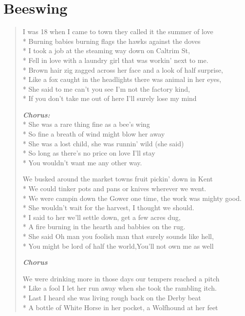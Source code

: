 \documentclass[9pt,twoside]{extarticle}
\newenvironment{xverse}{
	\begin{verse}
	\fontsize{8.5}{10.5}\selectfont
	}
	{
	\end{verse}
	\penalty 0
}
\newcommand{\chorusdef}{\textbf{\emph{Chorus:}}\\*}
\newcommand{\chorusmark}[1][1]{%
\vspace{-0.5\stanzaskip}%
\textbf{\emph{Chorus \ifthenelse{\equal{#1}{1}}{}{$\times$ #1}}}%
\vspace{-0.5\stanzaskip}%
}
\begin{document}
\section{Beeswing}
\begin{xverse}
I was 18 when I came to town they called it the summer of love \\*
Burning babies burning flags the hawks against the doves \\*
I took a job at the steaming way down on Caltrim St, \\*
Fell in love with a laundry girl that was workin’ next to me. \\*
Brown hair zig zagged across her face and a look of half surprise, \\*
Like a fox caught in the headlights there was animal in her eyes, \\*
She said to me can’t you see I’m not the factory kind, \\*
If you don’t take me out of here I’ll surely lose my mind

\chorusdef
She was a rare thing fine as a bee’s wing \\*
So fine a breath of wind might blow her away \\*
She was a lost child, she was runnin’ wild (she said) \\*
So long as there’s no price on love I’ll stay \\*
You wouldn’t want me any other way.

We busked around the market towns fruit pickin’ down in Kent \\*
We could tinker pots and pans or knives wherever we went. \\*
We were campin down the Gower one time, the work was mighty good. \\*
She wouldn’t wait for the harvest, I thought we should. \\*
I said to her we’ll settle down, get a few acres dug, \\*
A fire burning in the hearth and babbies on the rug. \\*
She said Oh man you foolish man that surely sounds like hell, \\*
You might be lord of half the world,You’ll not own me as well

\chorusmark

We were drinking more in those days our tempers reached a pitch \\*
Like a fool I let her run away when she took the rambling itch. \\*
Last I heard she was living rough back on the Derby beat \\*
A bottle of White Horse in her pocket, a Wolfhound at her feet


\end{xverse}
\end{document}
